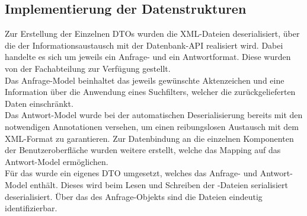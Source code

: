 \subsection{Implementierung der Datenstrukturen}
\label{sec:ImplementierungDatenstrukturen}
Zur Erstellung der Einzelnen \acs{DTO}s wurden die XML-Dateien deserialisiert, über die der Informationsaustausch mit der Datenbank-\acs{API}
realisiert wird. Dabei handelte es sich um jeweils ein Anfrage- und ein Antwortformat. Diese wurden von der Fachabteilung zur Verfügung
gestellt.\\
Das Anfrage-Model beinhaltet das jeweils gewünschte Aktenzeichen und eine Information über die Anwendung eines Suchfilters,
welcher die zurückgelieferten Daten einschränkt.\\
Das Antwort-Model wurde bei der automatischen Deserialisierung bereits mit den notwendigen Annotationen versehen,
um einen reibungslosen Austausch mit dem XML-Format zu garantieren. Zur Datenbindung an die einzelnen Komponenten der
Benutzeroberfläche wurden weitere  erstellt, welche das Mapping auf das Antwort-Model ermöglichen.\\
Für das  wurde ein eigenes \acs{DTO} umgesetzt, welches das Anfrage- und Antwort-Model enthält.
Dieses wird beim Lesen und Schreiben der -Dateien serialisiert \bzw deserialisiert.
Über das  des Anfrage-Objekts sind die Dateien eindeutig identifizierbar.

